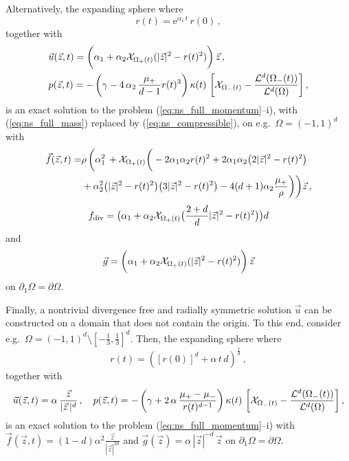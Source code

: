 Alternatively, the expanding sphere where
\begin{equation} \label{eq:r_benchmark2}
r(t) = \mathrm{e}^{\alpha_1\,t}\,r(0)\,,
\end{equation}
together with
\begin{align} \label{eq:up_benchmark2}
& \vec u(\vec z, t) = \bigg(\alpha_1+\alpha_2\mathrm{\mathcal{X}}_{\Omega_+(t)}(|\vec
z|^2-r(t)^2)\bigg)\,\vec z\,, \\
& p(\vec z, t) = -\,\bigg(\gamma - 4\,\alpha_2\,\frac{\mu_+}{d-1}r(t)^3
\bigg)\,\kappa(t)\,\left[ \mathrm{\mathcal{X}}_{\Omega_-(t)} -
\frac{\mathcal{L}^d(\Omega_-(t))}{\mathcal{L}^d(\Omega)}\right],
\end{align}
is an exact solution to the problem (\ref{eq:ns_full_momentum}--i), with
(\ref{eq:ns_full_mass}) replaced by (\ref{eq:ns_compressible}), on e.g.\ $\Omega
= (-1,1)^d$ with
\begin{align}
\vec f(\vec z, t) = &
\rho\,\bigg(\alpha_1^2\,+\mathrm{\mathcal{X}}_{\Omega_+(t)}\bigg(-2\alpha_1\alpha_2r(t)^2 +
2\alpha_1\alpha_2\big(2|\vec z|^2-r(t)^2\big) \nonumber \\
& +\alpha_2^2\big(|\vec z|^2-r(t)^2\big)\big(3|\vec z|^2 -
r(t)^2\big)-4(d+1)\alpha_2\frac{\mu_+}{\rho}\bigg)\bigg)\vec z\,,
\end{align}
\begin{equation}
f_{\rm{div}} = \big( \alpha_1
+ \alpha_2\mathrm{\mathcal{X}}_{\Omega_+(t)}\big(\frac{2+d}{d}|\vec z|^2-r(t)^2\big)\big)d
\end{equation}
and
\begin{equation}
\vec g = \bigg(\alpha_1+\alpha_2\mathrm{\mathcal{X}}_{\Omega_+(t)}(|\vec
z|^2-r(t)^2)\bigg)\,\vec z
\end{equation}
on $\partial_1\Omega=\partial\Omega$.

Finally, a nontrivial divergence free and radially symmetric solution $\vec u$
can be constructed on a domain that does not contain the origin. To this end,
consider e.g.\ $\Omega = (-1,1)^d \setminus [-\frac13, \frac13]^d$. Then, the
expanding sphere where
\begin{equation} \label{eq:r_benchmark3}
r(t) = ([r(0)]^d + \alpha\,t\,d)^\frac1d \,,
\end{equation}
together with
\begin{equation} \label{eq:up_benchmark3}
\vec u(\vec z, t) = \alpha\,\frac{\vec z}{|\vec z\,|^d}\,, \quad
p(\vec z, t) = -\,\bigg(\gamma +2\,\alpha\,\frac{\mu_+ - \mu_-}
{r(t)^{d-1}}\bigg)\,\kappa(t)\,\left[ \mathrm{\mathcal{X}}_{\Omega_-(t)} -
\frac{\mathcal{L}^d(\Omega_-(t))}{\mathcal{L}^d(\Omega)}\right],
\end{equation}
is an exact solution to the problem (\ref{eq:ns_full_momentum}--i) with
$\vec f(\vec z, t) = (1-d)\alpha^2\frac{\vec z}{|\vec z|^{2d}}$ and $\vec g(\vec
z) = \alpha\,|\vec z|^{-d}\,\vec z$ on $\partial_1\Omega=\partial\Omega$.

